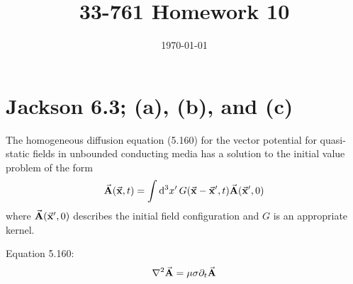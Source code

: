 \documentclass[a4paper,twoside]{article}
\title{33-761 Homework 10}
\date{\today}
\begin{document}
\maketitle

\section{Jackson 6.3; (a), (b), and (c)}

The homogeneous diffusion equation (5.160) for the vector potential for quasi-static fields in unbounded conducting media has a solution to the initial value problem of the form
\begin{equation}
    \va{A}( \va{x}, t) = \int \dd[3]{x'} G( \va{x} - \va{x}',t) \va{A}( \va{x}', 0)
\end{equation}
where $ \va{A}( \va{x}', 0) $ describes the initial field configuration and $ G $ is an appropriate kernel.

Equation 5.160:
\begin{equation}
    \laplacian{ \va{A}} = \mu \sigma \partial_t \va{A}
\end{equation}
\end{document}
